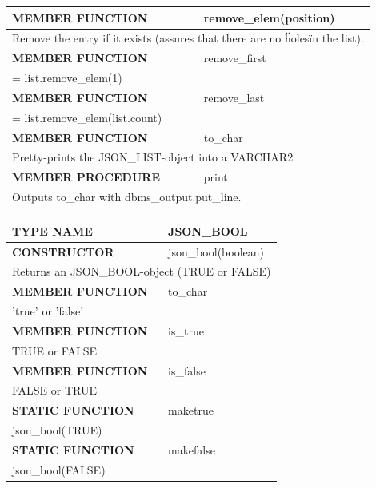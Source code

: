 \documentclass[11pt,twocolumn, a4paper]{article}
\begin{document}
\begin{longtable}{| l | l |}
\hline
  \textbf{MEMBER FUNCTION} & remove\_elem(position)\\
\hline
  \multicolumn{2}{|p{15cm}|}{Remove the entry if it exists (assures that there are no \"holes\" in the list).} \\
\hline

\hline
  \textbf{MEMBER FUNCTION} & remove\_first\\
\hline
  \multicolumn{2}{|p{15cm}|}{ = list.remove\_elem(1)} \\
\hline
\hline
  \textbf{MEMBER FUNCTION} & remove\_last\\
\hline
  \multicolumn{2}{|p{15cm}|}{ = list.remove\_elem(list.count)} \\
\hline

\hline
  \textbf{MEMBER FUNCTION} & to\_char\\
\hline
  \multicolumn{2}{|p{15cm}|}{Pretty-prints the JSON\_LIST-object into a VARCHAR2} \\
\hline

\hline
  \textbf{MEMBER PROCEDURE} & print\\
\hline
  \multicolumn{2}{|p{15cm}|}{Outputs to\_char with dbms\_output.put\_line.} \\
\hline

\end{longtable}

\begin{longtable}{| l | l |}

\hline
  \rowcolor{gray}\color{white}
  \textbf{TYPE NAME} & \color{white}\textbf{JSON\_BOOL} \\
\hline

\hline
  \textbf{CONSTRUCTOR} & json\_bool(boolean)\\
\hline
  \multicolumn{2}{|p{15cm}|}{Returns an JSON\_BOOL-object (TRUE or FALSE)} \\
\hline

\hline
  \textbf{MEMBER FUNCTION} & to\_char \\
\hline
  \multicolumn{2}{|p{15cm}|}{'true' or 'false'} \\
\hline

\hline
  \textbf{MEMBER FUNCTION} & is\_true \\
\hline
  \multicolumn{2}{|p{15cm}|}{TRUE or FALSE} \\
\hline

\hline
  \textbf{MEMBER FUNCTION} & is\_false \\
\hline
  \multicolumn{2}{|p{15cm}|}{FALSE or TRUE} \\
\hline

\hline
  \textbf{STATIC FUNCTION} & maketrue \\
\hline
  \multicolumn{2}{|p{15cm}|}{json\_bool(TRUE)} \\
\hline

\hline
  \textbf{STATIC FUNCTION} & makefalse \\
\hline
  \multicolumn{2}{|p{15cm}|}{json\_bool(FALSE)} \\
\hline

\end{longtable}
\end{document}
